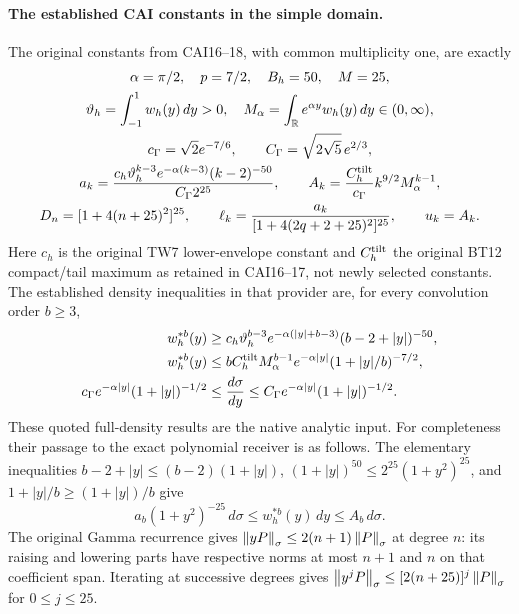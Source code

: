 \paragraph{The established CAI constants in the simple domain.}
The original constants from CAI16--18, with common multiplicity one,
are exactly
\begin{equation}\label{lgamma:eq:CAIconstants}
 \begin{gathered}
 \alpha=\pi/2,\quad p=7/2,\quad B_h=50,\quad M=25,\\
 \vartheta_h=\int_{-1}^1w_h(y)\,dy>0,\quad
 M_\alpha=\int_\mathbb R e^{\alpha y}w_h(y)\,dy\in(0,\infty),\\
 c_\Gamma=\sqrt2e^{-7/6},\qquad C_\Gamma=\sqrt{2\sqrt5}\,e^{2/3},\\
 a_k=\frac{c_h\vartheta_h^{k-3}e^{-\alpha(k-3)}(k-2)^{-50}}
              {C_\Gamma2^{25}},\qquad
 A_k=\frac{C_h^{\rm tilt}}{c_\Gamma}k^{9/2}M_\alpha^{k-1},\\
 D_n=[1+4(n+25)^2]^{25},\qquad
 \ell_k=\frac{a_k}{[1+4(2q+2+25)^2]^{25}},\qquad u_k=A_k.
 \end{gathered}
\end{equation}
Here $c_h$ is the original TW7 lower-envelope constant and
$C_h^{\rm tilt}$ the original BT12 compact/tail maximum as retained in
CAI16--17, not newly selected constants.  The established density
inequalities in that provider are, for every convolution order $b\ge3$,
\begin{align}
 w_h^{*b}(y)&\ge c_h\vartheta_h^{b-3}
 e^{-\alpha(|y|+b-3)}(b-2+|y|)^{-50},\label{lgamma:eq:CAIlowdens}\\
 w_h^{*b}(y)&\le bC_h^{\rm tilt}M_\alpha^{b-1}
 e^{-\alpha|y|}(1+|y|/b)^{-7/2},\label{lgamma:eq:CAIupdens}\\
 c_\Gamma e^{-\alpha|y|}(1+|y|)^{-1/2}
 &\le\frac{d\sigma}{dy}
 \le C_\Gamma e^{-\alpha|y|}(1+|y|)^{-1/2}.
 \label{lgamma:eq:CAIgammadens}
\end{align}
These quoted full-density results are the native analytic input.  For
completeness their passage to the exact polynomial receiver is as follows.
The elementary inequalities
$b-2+|y|\le(b-2)(1+|y|)$,
$(1+|y|)^{50}\le2^{25}(1+y^2)^{25}$, and
$1+|y|/b\ge(1+|y|)/b$ give
\[
 a_b(1+y^2)^{-25}\,d\sigma\le w_h^{*b}(y)\,dy\le A_b\,d\sigma.
\]
The original Gamma recurrence gives
$\left\lVert yP\right\rVert_\sigma\le2(n+1)\left\lVert P\right\rVert_\sigma$ at degree $n$:
its raising and lowering parts have respective norms at most $n+1$
and $n$ on that coefficient span.  Iterating at successive degrees gives
$\left\lVert y^jP\right\rVert_\sigma\le[2(n+25)]^j\left\lVert P\right\rVert_\sigma$ for $0\le j\le25$.
